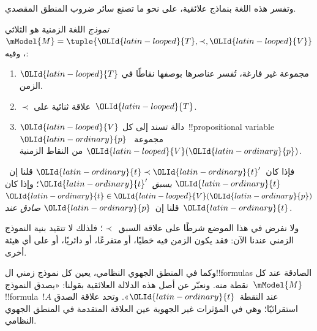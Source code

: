 \documentclass[../../../include/open-logic-section]{subfiles}
\begin{document}
وتفسر هذه اللغة بنماذج علائقية، على نحو ما تصنع سائر ضروب المنطق المقصدي.

\begin{defn}
  \emph{نموذج} اللغة الزمنية هو الثلاثي
  $\mModel{M}=\tuple{{\OLId{latin-looped}{T}},\prec,{\OLId{latin-looped}{V}}}$، وفيه:
  \begin{enumerate}
  \item ${\OLId{latin-looped}{T}}$ مجموعة غير فارغة، تُفسر عناصرها بوصفها نقاطًا في الزمن.
  \item $\prec$ علاقة ثنائية على~${\OLId{latin-looped}{T}}$.
  \item ${\OLId{latin-looped}{V}}$ دالة تسند إلى كل~!!{propositional
    variable}~${\OLId{latin-ordinary}{p}}$ مجموعة~${\OLId{latin-looped}{V}}({\OLId{latin-ordinary}{p}})$ من النقاط الزمنية.
  \end{enumerate}
  فإذا كان~${\OLId{latin-ordinary}{t}} \prec {\OLId{latin-ordinary}{t}}'$ قلنا إن~${\OLId{latin-ordinary}{t}}$ \emph{يسبق}~${\OLId{latin-ordinary}{t}}'$؛ وإذا كان
  ${\OLId{latin-ordinary}{t}} \in {\OLId{latin-looped}{V}}({\OLId{latin-ordinary}{p}})$ قلنا إن~${\OLId{latin-ordinary}{p}}$ \emph{صادق عند}~${\OLId{latin-ordinary}{t}}$.
\end{defn}

ولا نفرض في هذا الموضع شرطًا على علاقة السبق~$\prec$؛ فلذلك لا تتقيد بنية
النموذج الزمني عندنا الآن: فقد يكون الزمن فيه خطيًا، أو متفرعًا، أو دائريًا،
أو على أي هيئة أخرى.

وكما في المنطق الجهوي النظامي، يعين كل نموذج زمني ال!!{formula}s الصادقة
عند كل نقطة منه. ونعبّر عن أصل هذه الدلالة العلائقية بقولنا: «يصدق
النموذج~$\mModel{M}$ !!{formula}~$!A$ عند النقطة~${\OLId{latin-ordinary}{t}}$». وتحد علاقة الصدق
استقرائيًا؛ وهي في المؤثرات غير الجهوية عين العلاقة المتقدمة في المنطق
الجهوي النظامي.
\end{document}
